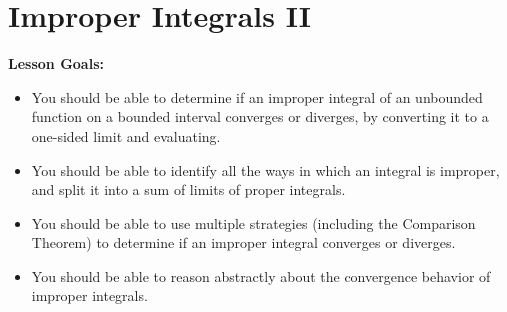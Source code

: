 \documentclass[main]{subfiles}
\begin{document}
\ifSubfilesClassLoaded{%
  \chaptermark{\chapterone}
}{}

\section{Improper Integrals II} \label{ws1-10}
\begin{framed}
\textbf{Lesson Goals:}
\begin{itemize}
\item You should be able to determine if an improper integral of an unbounded function on a bounded interval converges or diverges, by converting it to a one-sided limit and evaluating. 
\item You should be able to identify all the ways in which an integral is improper, and split it into a sum of limits of proper integrals.
\item You should be able to use multiple strategies (including the Comparison Theorem) to determine if an improper integral converges or diverges. 
\item You should be able to reason abstractly about the convergence behavior of improper integrals.
\end{itemize}
\end{framed}
\end{document}
